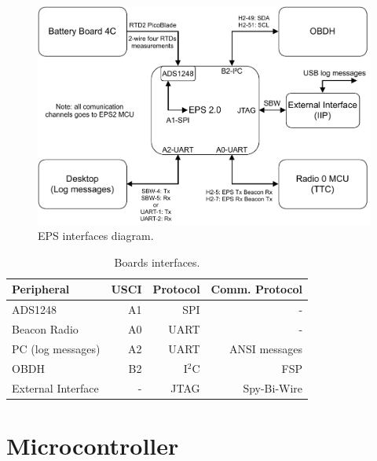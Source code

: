 \begin{figure}[!ht]
    \begin{center}
        \includegraphics[width=\textwidth]{figures/eps-interfaces-diagram.pdf}
        \caption{EPS interfaces diagram.}
        \label{fig:diagram-interfaces}
    \end{center}
\end{figure}

\begin{table}[!h]
    \centering
    \begin{tabular}{lrrr}
        \toprule[1.5pt]
        \textbf{Peripheral}     & \textbf{USCI} & \textbf{Protocol} & \textbf{Comm. Protocol} \\
        \midrule
        ADS1248                 & A1            & SPI               & - \\
        Beacon Radio            & A0            & UART              & - \\
        PC (log messages)       & A2            & UART              & ANSI messages \\
        OBDH                    & B2            & I$^{2}$C          & FSP \\
        External Interface      & -             & JTAG              & Spy-Bi-Wire \\
        \bottomrule[1.5pt]
    \end{tabular}
    \caption{Boards interfaces.}
    \label{tab:interfaces}
\end{table}

\section{Microcontroller}

